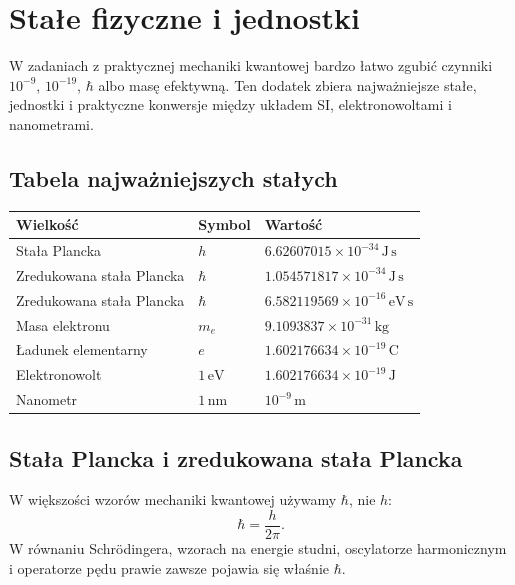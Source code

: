 \chapter{Stałe fizyczne i jednostki}

\begin{summarybox}
W zadaniach z praktycznej mechaniki kwantowej bardzo łatwo zgubić czynniki
\(10^{-9}\), \(10^{-19}\), \(\hbar\) albo masę efektywną. Ten dodatek zbiera
najważniejsze stałe, jednostki i praktyczne konwersje między układem SI,
elektronowoltami i nanometrami.
\end{summarybox}

\section{Tabela najważniejszych stałych}

\begin{center}
\begin{tabular}{lll}
\toprule
Wielkość & Symbol & Wartość \\
\midrule
Stała Plancka & \(h\) & \(6.62607015\times10^{-34}\,\mathrm{J\,s}\) \\
Zredukowana stała Plancka & \(\hbar\) & \(1.054571817\times10^{-34}\,\mathrm{J\,s}\) \\
Zredukowana stała Plancka & \(\hbar\) & \(6.582119569\times10^{-16}\,\mathrm{eV\,s}\) \\
Masa elektronu & \(m_e\) & \(9.1093837\times10^{-31}\,\mathrm{kg}\) \\
Ładunek elementarny & \(e\) & \(1.602176634\times10^{-19}\,\mathrm{C}\) \\
Elektronowolt & \(1\,\mathrm{eV}\) & \(1.602176634\times10^{-19}\,\mathrm{J}\) \\
Nanometr & \(1\,\mathrm{nm}\) & \(10^{-9}\,\mathrm{m}\) \\
\bottomrule
\end{tabular}
\end{center}

\section{Stała Plancka i zredukowana stała Plancka}

W większości wzorów mechaniki kwantowej używamy \(\hbar\), nie \(h\):
\begin{equation}
    \hbar=\frac{h}{2\pi}.
\end{equation}
W równaniu Schrödingera, wzorach na energie studni, oscylatorze harmonicznym i
operatorze pędu prawie zawsze pojawia się właśnie \(\hbar\).

